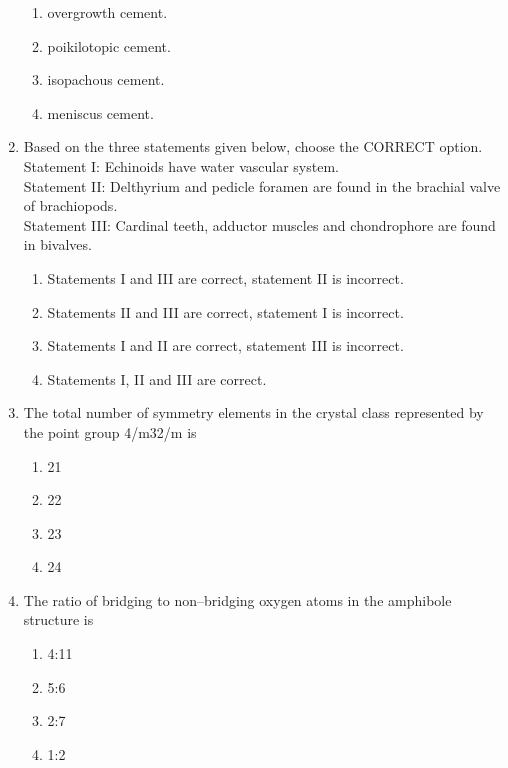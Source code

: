 \documentclass[journal,12pt,onecolumn]{IEEEtran}
\theoremstyle{remark}
\begin{document}
\begin{enumerate}
\begin{enumerate}
\item overgrowth cement.
\item poikilotopic cement.
\item isopachous cement.
\item meniscus cement.
\end{enumerate}
\vspace{0.5cm}

\item Based on the three statements given below, choose the CORRECT option.\\
Statement I: Echinoids have water vascular system.\\
Statement II: Delthyrium and pedicle foramen are found in the brachial valve of brachiopods.\\
Statement III: Cardinal teeth, adductor muscles and chondrophore are found in bivalves.
\begin{enumerate}
\item Statements I and III are correct, statement II is incorrect.
\item Statements II and III are correct, statement I is incorrect.
\item Statements I and II are correct, statement III is incorrect.
\item Statements I, II and III are correct.
\end{enumerate}
\vspace{0.5cm}

\item The total number of symmetry elements in the crystal class represented by the point group 4/m32/m is
\begin{enumerate}
\item 21
\item 22
\item 23
\item 24
\end{enumerate}
\vspace{0.5cm}

\item The ratio of bridging to non--bridging oxygen atoms in the amphibole structure is
\begin{enumerate}
\item 4:11
\item 5:6
\item 2:7
\item 1:2
\end{enumerate}
\vspace{0.5cm}


\end{enumerate}
\end{document}
